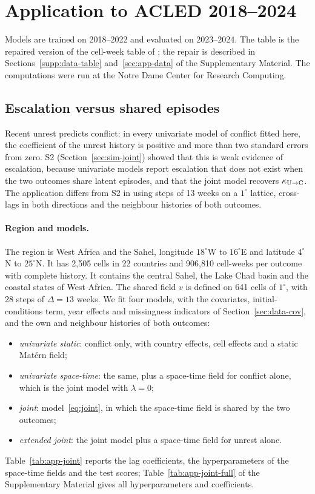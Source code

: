 \section{Application to ACLED 2018--2024}\label{sec:application}

Models are trained on 2018--2022 and evaluated on 2023--2024. The table is the
repaired version of the cell-week table of \citet{menicali2026conflicts}; the repair
is described in Sections~\ref{supp:data-table} and~\ref{sec:app-data} of the
Supplementary Material. The
computations were run at the Notre Dame Center for Research Computing.

\subsection{Escalation versus shared episodes}\label{sec:app-joint}

Recent unrest predicts conflict: in every univariate model of conflict fitted here,
the coefficient of the unrest history is positive and more than two standard errors
from zero. S2 (Section~\ref{sec:sim-joint}) showed that this is weak evidence of
escalation, because univariate models report escalation that does not exist when the
two outcomes share latent episodes, and that the joint model recovers $\kappa_{\mathrm{U}\to\mathrm{C}}$. The
application differs from S2 in using steps of 13 weeks on a $1^\circ$ lattice,
cross-lags in both directions and the neighbour histories of both outcomes.

\paragraph{Region and models.} The region is West Africa and the Sahel, longitude
$18^\circ$W to $16^\circ$E and latitude $4^\circ$N to $25^\circ$N. It has 2{,}505 cells
in 22 countries and 906{,}810 cell-weeks per outcome with complete history. It contains
the central Sahel, the Lake Chad basin and the coastal states of West Africa. The shared field $v$ is defined on 641 cells of
$1^\circ$, with 28 steps of $\Delta = 13$ weeks. We fit four models, with the
covariates, initial-conditions term, year effects and missingness indicators of
Section~\ref{sec:data-cov}, and the own and neighbour
histories of both outcomes:
\begin{itemize}
\item \emph{univariate static}: conflict only, with country effects, cell effects and a
static Mat\'ern field;
\item \emph{univariate space-time}: the same, plus a space-time field for conflict
alone, which is the joint model with $\lambda = 0$;
\item \emph{joint}: model~\eqref{eq:joint}, in which the space-time field is shared by the
two outcomes;
\item \emph{extended joint}: the joint model plus a space-time field for unrest alone.
\end{itemize}
Table~\ref{tab:app-joint} reports the lag coefficients, the hyperparameters of the
space-time fields and the test scores; Table~\ref{tab:app-joint-full} of the
Supplementary Material gives all hyperparameters and coefficients.


